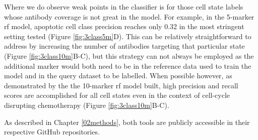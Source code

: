Where we do observe weak points in the classifier is for those cell state labels whose antibody coverage is not great in the model. For example, in the 5-marker \acrshort{rf} model, apoptotic cell class precision reaches only 0.32 in the most stringent setting tested (Figure \ref{fig:3class5m}D). This can be relatively straightforward to address by increasing the number of antibodies targeting that particular state (Figure \ref{fig:3class10m}B-C), but this strategy can not always be employed as the additional marker would both need to be in the reference data used to train the model and in the query dataset to be labelled. When possible however, as demonstrated by the the 10-marker \acrshort{rf} model built, high precision and recall scores are accomplished for all cell states even in the context of cell-cycle disrupting chemotherapy (Figure \ref{fig:3class10m}B-C).

As described in Chapter \ref{02methods}, both tools are publicly accessible in their respective GitHub repositories. 